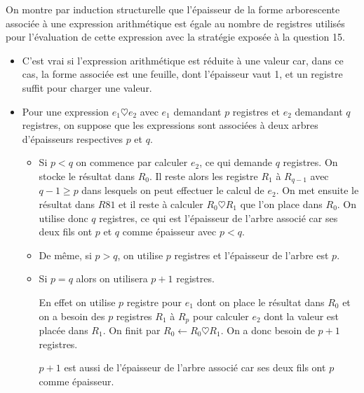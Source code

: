 \begin{Exercise}
\begin{center}
\end{center}

On montre par induction structurelle que l'épaisseur de la forme arborescente associée à une expression arithmétique est égale au nombre de registres utilisés pour l'évaluation de cette expression avec la stratégie exposée à la question 15.

\begin{itemize}
    \item C'est vrai si l'expression arithmétique est réduite à une valeur car, dans ce cas, la forme associée est une feuille, dont l'épaisseur vaut 1, et un registre suffit pour charger une valeur.
    \item Pour une expression $e_1\heartsuit e_2$ avec $e_1$ demandant $p$ registres et $e_2$ demandant $q$ registres, on suppose que les expressions sont associées à deux arbres d'épaisseurs respectives $p$ et $q$.
    \begin{itemize}
        \item Si $p < q$ on commence par calculer $e_2$, ce qui demande $q$ registres. On stocke le résultat dans $R_0$. Il reste alors les registre $R_1$ à $R_{q-1}$ avec $q-1\ge p$ dans lesquels on peut effectuer le calcul de $e_2$. On met ensuite le résultat dans $R81$ et il reste à calculer $R_0 \heartsuit R_1$ que l'on place dans $R_0$. On utilise donc $q$ registres, ce qui est l'épaisseur de l'arbre associé car ses deux fils ont $p$ et $q$ comme épaisseur avec $p < q$.
        \item De même, si $p> q$, on utilise $p$ registres et l'épaisseur de l'arbre est $p$.
        \item Si $p=q$ alors on utilisera $p+1$ registres.
        
        En effet on utilise $p$ registre pour $e_1$ dont on place le résultat dans $R_0$ et on a besoin des $p$ registres $R_1$ à $R_p$ pour calculer $e_2$ dont la valeur est placée dans $R_1$. On finit par $R_0 \leftarrow R_0 \heartsuit R_1$. On a donc besoin de $p+1$ registres.
        
        $p+1$ est aussi de l'épaisseur de l'arbre associé car ses deux fils ont $p$ comme épaisseur.
    \end{itemize}
\end{itemize}
\end{Exercise}
